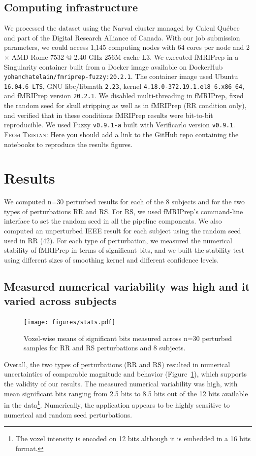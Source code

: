 \documentclass[lettersize,journal]{IEEEtran}
\newcommand{\TG}[1]{\color{orange}\textsc{From Tristan:} #1\color{black}\xspace}
\newcommand{\fmriprep}{fMRIPrep\xspace}
\begin{document}
\subsection{Computing infrastructure}

We processed the dataset using the Narval cluster managed by Calcul Qu\'ebec and part of the Digital Research Alliance of Canada. With our job submission parameters, we could access 1,145 computing nodes with 64 cores per node and 2 $\times$ AMD Rome 7532 @ 2.40 GHz 256M cache L3. We executed \fmriprep in a Singularity container built from a Docker image available on DockerHub \texttt{yohanchatelain/fmriprep-fuzzy:20.2.1}. The container image used Ubuntu \texttt{16.04.6 LTS}, GNU libc/libmath \texttt{2.23}, kernel \texttt{4.18.0-372.19.1}\texttt{.el8\_6.x86\_64}, and fMRIPrep version \texttt{20.2.1}. We disabled multi-threading in fMRIPrep, fixed the random seed for skull stripping as well as in fMRIPrep (RR condition only), and verified that in these conditions fMRIPrep results were bit-to-bit reproducible.
We used Fuzzy \texttt{v0.9.1-a} built with Verificarlo version \texttt{v0.9.1}. \TG{Here you should add a link to the GitHub repo containing the notebooks to reproduce the results figures.}

\section{Results}

We computed n=30 perturbed results for each of the 8 subjects and for the two types of perturbations RR and RS. For RS, we used \fmriprep's command-line interface to set the random seed in all the pipeline components. We also computed an unperturbed IEEE result for each subject using the random seed used in RR (42). For each type of perturbation, we measured the numerical stability of fMRIPrep in terms of significant bits, and we built the stability test using different sizes of smoothing kernel and different confidence levels.

\subsection{Measured numerical variability was high and it varied across subjects}

\begin{figure}
  \centering
  \texttt{[image: figures/stats.pdf]}
  \caption{Voxel-wise means of significant bits
    measured across n=30 perturbed samples for RR and RS perturbations and 8
    subjects.}
  \label{fig:significant-digits}
\end{figure}
Overall, the two types of perturbations (RR and RS) resulted in numerical uncertainties of comparable magnitude and behavior (Figure~\ref{fig:significant-digits}), which supports the validity of our results. The measured numerical variability was high, with mean significant bits ranging from 2.5 bits to 8.5 bits out of the 12 bits available in the data\footnote{The voxel intensity is encoded on 12 bits although it is embedded in a 16 bits format.}. Numerically, the application appears to be highly sensitive to numerical and random seed perturbations.
\end{document}
